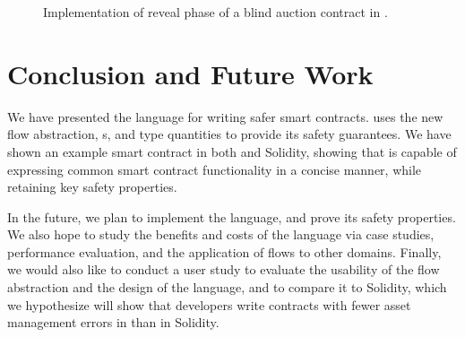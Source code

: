 \documentclass[dvipsnames,runningheads]{llncs}
\begin{document}
\begin{figure}
    \centering
    
    \vspace{-1em}
    \caption{Implementation of reveal phase of a blind auction contract in \langName.}
    \label{fig:blind-auction-impl-flow}
\end{figure}

\section{Conclusion and Future Work}

We have presented the \langName language for writing safer smart contracts.
\langName uses the new flow abstraction, \assetTxt{}s, and type quantities to provide its safety guarantees.
We have shown an example smart contract in both \langName and Solidity, showing that \langName is capable of expressing common smart contract functionality in a concise manner, while retaining key safety properties.

In the future, we plan to implement the \langName language, and prove its safety properties.
We also hope to study the benefits and costs of the language via case studies, performance evaluation, and the application of flows to other domains.
Finally, we would also like to conduct a user study to evaluate the usability of the flow abstraction and the design of the language, and to compare it to Solidity, which we hypothesize will show that developers write contracts with fewer asset management errors in \langName than in Solidity.



\end{document}
